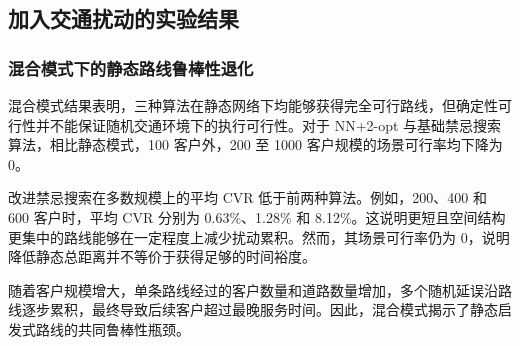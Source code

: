 \documentclass[12pt,a4paper,UTF8]{article}
\begin{document}
\subsection{加入交通扰动的实验结果}
\subsubsection{混合模式下的静态路线鲁棒性退化}
混合模式结果表明，三种算法在静态网络下均能够获得完全可行路线，但确定性可行性并不能保证随机交通环境下的执行可行性。对于 NN+2-opt 与基础禁忌搜索算法，相比静态模式，100 客户外，200 至 1000 客户规模的场景可行率均下降为 0。

改进禁忌搜索在多数规模上的平均 CVR 低于前两种算法。例如，200、400 和 600 客户时，平均 CVR 分别为 0.63\%、1.28\% 和 8.12\%。这说明更短且空间结构更集中的路线能够在一定程度上减少扰动累积。然而，其场景可行率仍为 0，说明降低静态总距离并不等价于获得足够的时间裕度。

随着客户规模增大，单条路线经过的客户数量和道路数量增加，多个随机延误沿路线逐步累积，最终导致后续客户超过最晚服务时间。因此，混合模式揭示了静态启发式路线的共同鲁棒性瓶颈。
\begin{table}[!htbp]
    \centering
    \caption{混合模式下三种启发式算法的交通扰动评估结果}
    \label{tab:hybrid_cvr_feasible_results}
\end{table}
\end{document}
